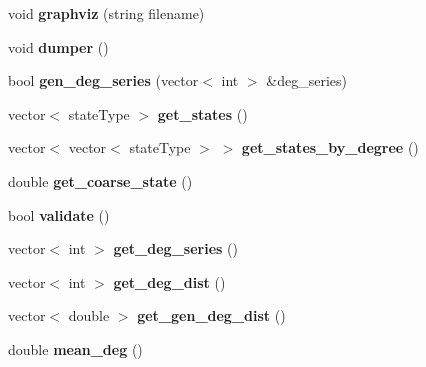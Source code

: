 \begin{DoxyCompactItemize}
\item 
\hypertarget{classNetwork_a715ff2af7d730dfbf6dcc7df6f1d5f1e}{}void {\bfseries graphviz} (string filename)\label{classNetwork_a715ff2af7d730dfbf6dcc7df6f1d5f1e}

\item 
\hypertarget{classNetwork_ad1a7e13122c4f9f57cf18c4209dfe36e}{}void {\bfseries dumper} ()\label{classNetwork_ad1a7e13122c4f9f57cf18c4209dfe36e}

\item 
\hypertarget{classNetwork_a4e178cc9e4b881720e87ee74079f3eca}{}bool {\bfseries gen\+\_\+deg\+\_\+series} (vector$<$ int $>$ \&deg\+\_\+series)\label{classNetwork_a4e178cc9e4b881720e87ee74079f3eca}

\item 
\hypertarget{classNetwork_af81e5b4d67998d298017ec9ec66484e2}{}vector$<$ state\+Type $>$ {\bfseries get\+\_\+states} ()\label{classNetwork_af81e5b4d67998d298017ec9ec66484e2}

\item 
\hypertarget{classNetwork_a1692dbef538bf487d16188a59b4e46a0}{}vector$<$ vector$<$ state\+Type $>$ $>$ {\bfseries get\+\_\+states\+\_\+by\+\_\+degree} ()\label{classNetwork_a1692dbef538bf487d16188a59b4e46a0}

\item 
\hypertarget{classNetwork_a5573ffefb3a8890ec33510268024c32f}{}double {\bfseries get\+\_\+coarse\+\_\+state} ()\label{classNetwork_a5573ffefb3a8890ec33510268024c32f}

\item 
\hypertarget{classNetwork_a4d400d268d537cbd00b1703a5ad74103}{}bool {\bfseries validate} ()\label{classNetwork_a4d400d268d537cbd00b1703a5ad74103}

\item 
\hypertarget{classNetwork_a8e72ffb8dcc1ea35bffbca3c1acb50d9}{}vector$<$ int $>$ {\bfseries get\+\_\+deg\+\_\+series} ()\label{classNetwork_a8e72ffb8dcc1ea35bffbca3c1acb50d9}

\item 
\hypertarget{classNetwork_a1472b8a33c27fccb2cd3b84062a6bb4b}{}vector$<$ int $>$ {\bfseries get\+\_\+deg\+\_\+dist} ()\label{classNetwork_a1472b8a33c27fccb2cd3b84062a6bb4b}

\item 
\hypertarget{classNetwork_a14841f262bd881614eb9311543fa0af7}{}vector$<$ double $>$ {\bfseries get\+\_\+gen\+\_\+deg\+\_\+dist} ()\label{classNetwork_a14841f262bd881614eb9311543fa0af7}

\item 
\hypertarget{classNetwork_aecc7b85001c902af1aa0a4b086fd0ed2}{}double {\bfseries mean\+\_\+deg} ()\label{classNetwork_aecc7b85001c902af1aa0a4b086fd0ed2}


\end{DoxyCompactItemize}
